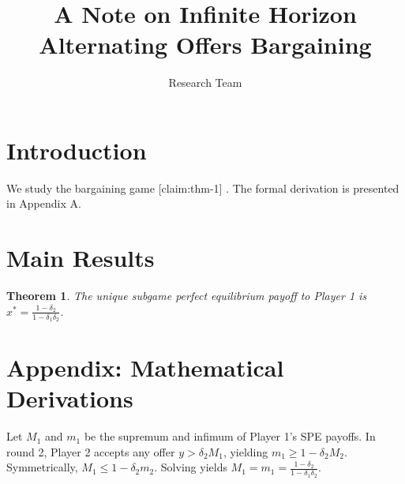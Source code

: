 \documentclass{article}
\newtheorem{theorem}{Theorem}
\begin{document}
\title{A Note on Infinite Horizon Alternating Offers Bargaining}
\author{Research Team}
\maketitle
\section{Introduction}
We study the bargaining game [claim:thm-1] \cite{rubinstein1982}. The formal derivation is presented in Appendix A.
\section{Main Results}
\begin{theorem}
The unique subgame perfect equilibrium payoff to Player 1 is $x^* = \frac{1-\delta_2}{1-\delta_1\delta_2}$.
\end{theorem}
\section{Appendix: Mathematical Derivations}
Let $M_1$ and $m_1$ be the supremum and infimum of Player 1's SPE payoffs.
In round 2, Player 2 accepts any offer $y > \delta_2 M_1$, yielding $m_1 \ge 1 - \delta_2 M_2$.
Symmetrically, $M_1 \le 1 - \delta_2 m_2$. Solving yields $M_1 = m_1 = \frac{1-\delta_2}{1-\delta_1\delta_2}$.


\end{document}
